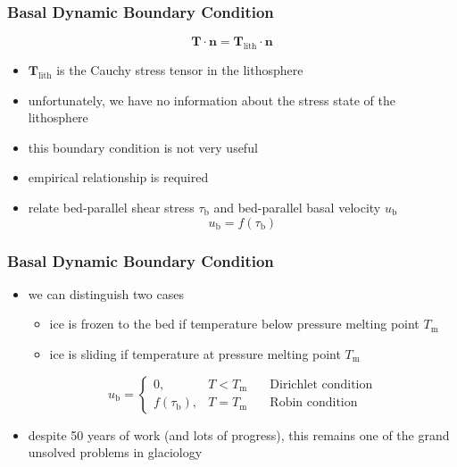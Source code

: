 \documentclass[hide notes,intlimits]{beamer}
\begin{document}
\begin{frame}
  \frametitle{Basal Dynamic Boundary Condition}
  \begin{equation}
    \mathbf{T}\cdot\mathbf{n} = \mathbf{T}_{\text{lith}}\cdot\mathbf{n} 
  \end{equation}
  \begin{itemize}
  \item $\mathbf{T}_{\text{lith}}$ is the Cauchy stress tensor in the lithosphere
  \item unfortunately, we have no information about the stress state of the lithosphere
  \item this boundary condition is not very useful
  \item empirical relationship is required
  \item relate bed-parallel shear stress $\tau_{\text{b}}$ and bed-parallel basal velocity $u_{\text{b}}$
    \begin{equation*}
      u_{\text{b}} = f(\tau_{\text{b}})
    \end{equation*}
  \end{itemize}
\end{frame}


\begin{frame}
  \frametitle{Basal Dynamic Boundary Condition}
 \begin{itemize}
   \item we can distinguish two cases
     \begin{itemize}
     \item ice is frozen to the bed if temperature below pressure melting point $T_{\text{m}}$
     \item ice is sliding if temperature at pressure melting point $T_{\text{m}}$
     \end{itemize}
    \begin{equation*}
      u_{\text{b}} = \left\{
        \begin{array}{lcl}
          0, & T< T_{\text{m}} & \quad \text{Dirichlet condition}\\
          f(\tau_{\text{b}}), & T= T_{\text{m}} & \quad \text{Robin condition}
        \end{array}
        \right.
    \end{equation*}
    \item despite 50 years of work (and lots of progress), this remains one of the grand unsolved problems in glaciology
  \end{itemize}
\end{frame}
\end{document}
